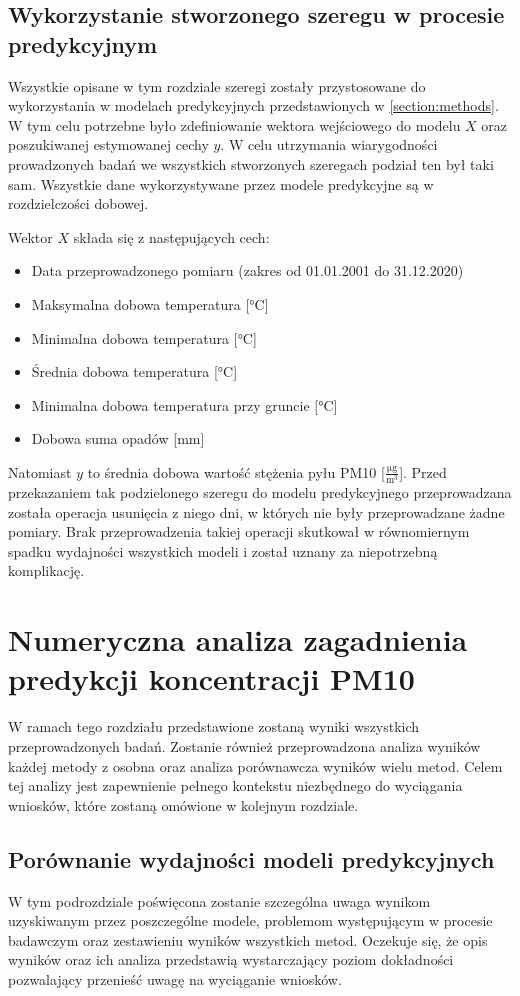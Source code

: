 \documentclass[10pt,a4paper]{article}
\begin{document}
\subsection{Wykorzystanie stworzonego szeregu w procesie predykcyjnym}
Wszystkie opisane w tym rozdziale szeregi zostały przystosowane do wykorzystania w modelach predykcyjnych przedstawionych w \autoref{section:methods}. W tym celu potrzebne było zdefiniowanie wektora wejściowego do modelu $X$ oraz poszukiwanej estymowanej cechy $y$. W celu utrzymania wiarygodności prowadzonych badań we wszystkich stworzonych szeregach podział ten był taki sam. Wszystkie dane wykorzystywane przez modele predykcyjne są w rozdzielczości dobowej.

Wektor $X$ składa się z następujących cech:
\begin{itemize}
	\item Data przeprowadzonego pomiaru (zakres od 01.01.2001 do 31.12.2020)
	\item Maksymalna dobowa temperatura [$\si\celsius$]
	\item Minimalna dobowa temperatura [$\si\celsius$]
	\item Średnia dobowa temperatura [$\si\celsius$]
	\item Minimalna dobowa temperatura przy gruncie [$\si\celsius$]
	\item Dobowa suma opadów [$\si{\milli\meter}$]
\end{itemize}
Natomiast $y$ to średnia dobowa wartość stężenia pyłu PM10 [$\frac{\si{\micro\gram}}{\si\meter^3}$]. Przed przekazaniem tak podzielonego szeregu do modelu predykcyjnego przeprowadzana została operacja usunięcia z niego dni, w których nie były przeprowadzane żadne pomiary. Brak przeprowadzenia takiej operacji skutkował w równomiernym spadku wydajności wszystkich modeli i został uznany za niepotrzebną komplikację. 

\newpage
\section{Numeryczna analiza zagadnienia predykcji koncentracji PM10}
W ramach tego rozdziału przedstawione zostaną wyniki wszystkich przeprowadzonych badań. Zostanie również przeprowadzona analiza wyników każdej metody z osobna oraz analiza porównawcza wyników wielu metod. Celem tej analizy jest zapewnienie pełnego kontekstu niezbędnego do wyciągania wniosków, które zostaną omówione w kolejnym rozdziale. 

\subsection{Porównanie wydajności modeli predykcyjnych}
W tym podrozdziale poświęcona zostanie szczególna uwaga wynikom uzyskiwanym przez poszczególne modele, problemom występującym w procesie badawczym oraz zestawieniu wyników wszystkich metod. Oczekuje się, że opis wyników oraz ich analiza przedstawią wystarczający poziom dokładności pozwalający przenieść uwagę na wyciąganie wniosków.
 
\end{document}
